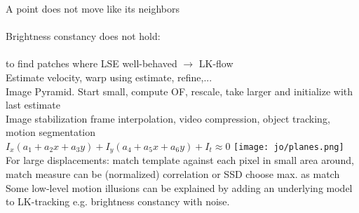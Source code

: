 A point does not move like its neighbors \\
\\
Brightness constancy does not hold:\\
 \\
 to find patches where LSE well-behaved $\rightarrow$ LK-flow\\
 Estimate velocity, warp using estimate, refine,...\\
 Image Pyramid. Start small, compute OF, rescale, take larger and initialize with last estimate\\
 Image stabilization  frame interpolation, video compression, object tracking, motion segmentation\\
 $I_x(a_1 + a_2x + a_3y) + I_y(a_4 + a_5x + a_6y) + I_t \approx 0$ \texttt{[image: jo/planes.png]}\\
 For large displacements: match template against each pixel in small area around, match measure can be (normalized) correlation or SSD choose max. as match \\
 Some low-level motion illusions can be explained by adding an underlying model to LK-tracking e.g. brightness constancy with noise.
